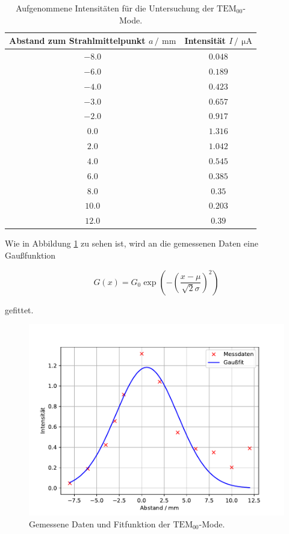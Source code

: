 \begin{table}
  \centering
  \caption{Aufgenommene Intensitäten für die Untersuchung der $\text{TEM}_{00}$-Mode.}
  \label{tab:TEM00}
  \begin{tabular}{c c}
    \toprule
    Abstand zum Strahlmittelpunkt $a\,/\,\SI{}{\milli\meter}$&Intensität $I \,/\,\SI{}{\micro\ampere}$\\
    \midrule
    $\num{-8.0}$&$\num{0.048}$\\
    $\num{-6.0}$&$\num{0.189}$\\
    $\num{-4.0}$&$\num{0.423}$\\
    $\num{-3.0}$&$\num{0.657}$\\
    $\num{-2.0}$&$\num{0.917}$\\
    $\num{0.0}$&$\num{1.316}$\\
    $\num{2.0}$&$\num{1.042}$\\
    $\num{4.0}$&$\num{0.545}$\\
    $\num{6.0}$&$\num{0.385}$\\
    $\num{8.0}$&$\num{0.35}$\\
    $\num{10.0}$&$\num{0.203}$\\
    $\num{12.0}$&$\num{0.39}$\\
    \bottomrule
  \end{tabular}
\end{table}
\FloatBarrier

Wie in Abbildung \ref{fig:TEM00} zu sehen ist, wird an die gemessenen Daten eine Gaußfunktion

\begin{equation}
  \label{eq:Gaußfunktion}
  G(x)= G_{0}\exp{\left(-\left(\frac{x-\mu}{\sqrt{2}\sigma}\right)^2\right)}
\end{equation} 

gefittet. 

\FloatBarrier
\begin{figure}
  \centering
  \includegraphics[width = \textwidth, keepaspectratio]{figure/TEM00.pdf}
  \caption{Gemessene Daten und Fitfunktion der $\text{TEM}_{00}$-Mode.}
  \label{fig:TEM00}
\end{figure}
\FloatBarrier

